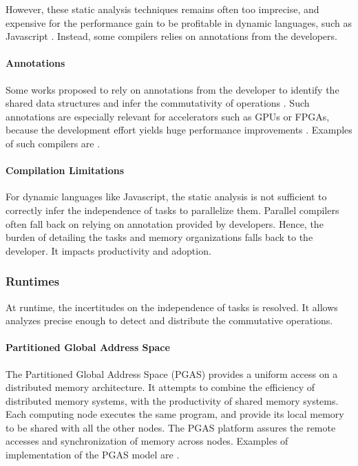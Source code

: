 However, these static analysis techniques remains often too imprecise, and expensive for the performance gain to be profitable in dynamic languages, such as Javascript \cite{Shivers1991}.
Instead, some compilers relies on annotations from the developers.

\paragraph{Annotations}

Some works proposed to rely on annotations from the developer to identify the shared data structures and infer the commutativity of operations \cite{Vandierendonck2010a,Fernandez2014a}.
Such annotations are especially relevant for accelerators such as GPUs or FPGAs, because the development effort yields huge performance improvements \cite{Tarditi2006}.
Examples of such compilers are .


\paragraph{Compilation Limitations}

For dynamic languages like Javascript, the static analysis is not sufficient to correctly infer the independence of tasks to parallelize them.
Parallel compilers often fall back on relying on annotation provided by developers.
Hence, the burden of detailing the tasks and memory organizations falls back to the developer.
It impacts productivity and adoption.

\subsubsection{Runtimes} \label{chapter3:software-adoption:runtimes}

At runtime, the incertitudes on the independence of tasks is resolved.
It allows analyzes precise enough to detect and distribute the commutative operations.

\paragraph{Partitioned Global Address Space}

The Partitioned Global Address Space (PGAS) provides a uniform access on a distributed memory architecture.
It attempts to combine the efficiency of distributed memory systems, with the productivity of shared memory systems.
Each computing node executes the same program, and provide its local memory to be shared with all the other nodes.
The PGAS platform assures the remote accesses and synchronization of memory across nodes.
Examples of implementation of the PGAS model are .

